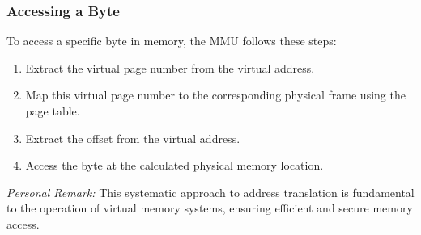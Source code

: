 \vspace{40px}
\subsubsection{Accessing a Byte}
To access a specific byte in memory, the MMU follows these steps:
\begin{enumerate}
  \item Extract the virtual page number from the virtual address.
  \item Map this virtual page number to the corresponding physical frame using the page table.
  \item Extract the offset from the virtual address.
  \item Access the byte at the calculated physical memory location.
\end{enumerate}

\textit{Personal Remark:} This systematic approach to address translation is fundamental to the operation of virtual memory systems, ensuring efficient and secure memory access.

\newpage
